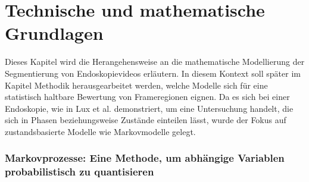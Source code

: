 \section{Technische und mathematische Grundlagen}

Dieses Kapitel wird die Herangehensweise an die mathematische Modellierung der Segmentierung von Endoskopievideos erläutern.
In diesem Kontext soll später im Kapitel Methodik herausgearbeitet werden, welche Modelle sich für eine statistisch haltbare Bewertung von Frameregionen eignen. Da es sich bei einer Endoskopie, wie in Lux et al.\cite{lux-2023} demonstriert, um eine Untersuchung handelt, die sich in Phasen beziehungsweise Zustände einteilen lässt, wurde der Fokus auf zustandsbasierte Modelle wie Markovmodelle gelegt.

\subsubsection{Markovprozesse: Eine Methode, um abhängige Variablen probabilistisch zu quantisieren}

